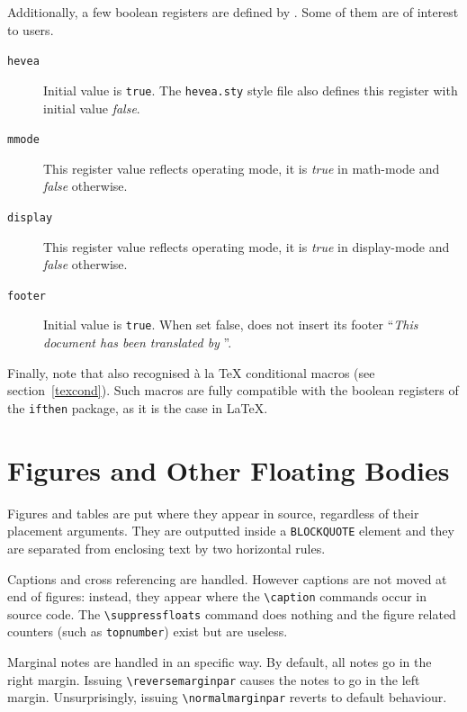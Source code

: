 Additionally, a few boolean registers are defined by \hevea{}.
Some of them are of interest to users.
\begin{description}
\item[\texttt{hevea}] Initial value is \texttt{true}.
The \texttt{hevea.sty} style file also defines this register with
initial value \textit{false}.
\item[\texttt{mmode}] This register value reflects \hevea{} operating
mode, it is \textit{true} in math-mode and \textit{false} otherwise.
\item[\texttt{display}]  This register value reflects \hevea{} operating
mode, it is \textit{true} in display-mode and \textit{false} otherwise.
\item[\texttt{footer}] Initial value is  \texttt{true}.
When set false, \hevea{} does not insert its footer ``\emph{This
document has been translated by \hevea}''.

\end{description}

Finally, note that \hevea{} also recognised \`a la \TeX{} conditional
macros (see section~\ref{texcond}). Such macros are fully compatible
with the boolean registers of the \texttt{ifthen} package, as it is
the case in \LaTeX.


\section{Figures and Other Floating Bodies}

Figures and tables are put where they appear in source, regardless of
their placement arguments.
They are outputted  inside a \verb+BLOCKQUOTE+ element and they are
separated from enclosing text by two
horizontal rules.

Captions and cross referencing are handled.
However captions are not moved at end of figures: instead, they appear
where the \verb+\caption+ commands occur in source code.
The \verb+\suppressfloats+ command does nothing and the
figure related counters (such as \verb+topnumber+) exist but are useless.

%
%
%
\reversemarginpar%
\normalmarginpar%
Marginal notes are handled in an \hevea{} specific way.
By default, all notes go in the right margin.
Issuing \verb+\reversemarginpar+ causes the notes to go in the left
margin. Unsurprisingly, issuing \verb+\normalmarginpar+ reverts to
default behaviour.

